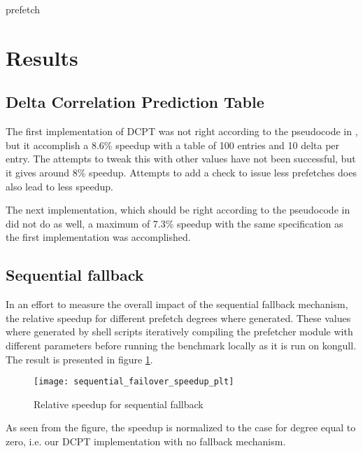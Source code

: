 \documentclass[12pt,journal,compsoc]{IEEEtran}
\begin{document}
\begin{algorithm}[H]
\dontprintsemicolon
{}

\caption{prefetch\label{pre}}
\end{algorithm}

\section{Results}
\subsection{Delta Correlation Prediction Table}
The first implementation of DCPT was not right according to the pseudocode in \cite{dcptpaper}, but it accomplish a 8.6\% speedup with a table of 100 entries and 10 delta per entry.
The attempts to tweak this with other values have not been successful, but it gives around 8\% speedup.
Attempts to add a check to issue less prefetches does also lead to less speedup.

The next implementation, which should be right according to the pseudocode in \cite{dcptpaper} did not do as well, a maximum of 7.3\% speedup with the same specification as the first implementation was accomplished.

\subsection{Sequential fallback}
In an effort to measure the overall impact of the sequential fallback
mechanism, the relative speedup for different prefetch degrees where
generated. These values where generated by shell scripts iteratively
compiling the prefetcher module with different parameters before running
the benchmark locally as it is run on kongull. The result is presented in
figure \ref{fig:fallback}.

\begin{figure}
\begin{center}
\texttt{[image: sequential\_failover\_speedup\_plt]}
\end{center}
\caption{\label{fig:fallback} Relative speedup for sequential fallback}
\end{figure}

As seen from the figure, the speedup is normalized to the case for degree equal
to zero, i.e. our DCPT implementation with no fallback mechanism.
\end{document}
